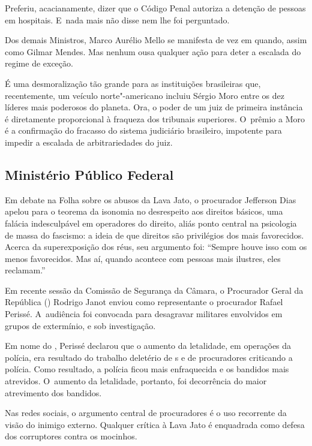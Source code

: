 Preferiu, acacianamente, dizer que o Código Penal autoriza a detenção de
pessoas em hospitais. E~nada mais não disse nem lhe foi perguntado.

Dos demais Ministros, Marco Aurélio Mello se manifesta de vez em quando,
assim como Gilmar Mendes. Mas nenhum ousa qualquer ação para deter a
escalada do regime de exceção.

É uma desmoralização tão grande para as instituições brasileiras que,
recentemente, um veículo norte"-americano incluiu Sérgio Moro entre os
dez líderes mais poderosos do planeta. Ora, o poder de um juiz de
primeira instância é diretamente proporcional à fraqueza dos tribunais
superiores. O~prêmio a Moro é a confirmação do fracasso do sistema
judiciário brasileiro, impotente para impedir a escalada de
arbitrariedades do juiz.

\subsection{Ministério Público Federal}

Em debate na Folha sobre os abusos da Lava Jato, o procurador Jefferson
Dias apelou para o teorema da isonomia no desrespeito aos direitos
básicos, uma falácia indesculpável em operadores do direito, aliás ponto
central na psicologia de massa do fascismo: a ideia de que direitos são
privilégios dos mais favorecidos. Acerca da superexposição dos réus, seu
argumento foi: ``Sempre houve isso com os menos favorecidos. Mas aí,
quando acontece com pessoas mais ilustres, eles reclamam.''

Em recente sessão da Comissão de Segurança da Câmara, o Procurador Geral
da República () Rodrigo Janot enviou como representante o procurador
Rafael Perissé. A~audiência foi convocada para desagravar militares
envolvidos em grupos de extermínio, e sob investigação.

Em nome do , Perissé declarou que o aumento da letalidade, em
operações da polícia, era resultado do trabalho deletério de s e de
procuradores criticando a polícia. Como resultado, a polícia ficou mais
enfraquecida e os bandidos mais atrevidos. O~aumento da letalidade,
portanto, foi decorrência do maior atrevimento dos bandidos.

 

Nas redes sociais, o argumento central de procuradores é o uso
recorrente da visão do inimigo externo. Qualquer crítica à Lava Jato é
enquadrada como defesa dos corruptores contra os mocinhos.

